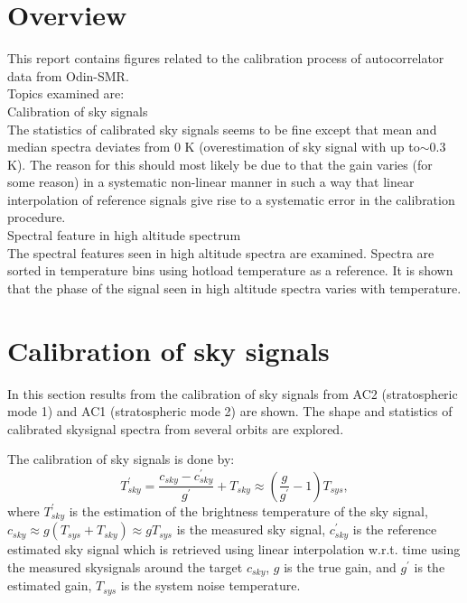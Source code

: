 \section{Overview}
This report contains figures related to the calibration
process of autocorrelator data from Odin-SMR.\\
\newline
Topics examined are:\\
\newline
Calibration of sky signals\\
The statistics of calibrated sky signals seems to be fine
except that mean and median spectra deviates from 0 K
(overestimation of sky signal with up to\(\sim\)0.3 K).
The reason for this should most likely be due to that
the gain varies (for some reason) in a systematic non-linear manner
in such a way that linear interpolation
of reference signals give rise to a systematic error
in the calibration procedure.\\
\newline
Spectral feature in high altitude spectrum\\
The spectral features seen in high altitude spectra are
examined. Spectra are sorted in temperature bins
using hotload temperature as a reference.
It is shown that the phase of the signal seen in high
altitude spectra varies with temperature.
\clearpage
\newpage

\section{Calibration of sky signals}
In this section results from the calibration of sky signals
from AC2 (stratospheric mode 1) and AC1 (stratospheric mode 2)
are shown. The shape and statistics of calibrated skysignal
spectra from several orbits are explored.  

The calibration of sky signals is done by:
\begin{equation}
\label{eq:skysig}
T^{'}_{sky}=\frac{c_{sky}-c^{'}_{sky}}{g^{'}}+T_{sky}\approx(\frac{g}{g^{'}}-1)T_{sys},
\end{equation}
where \(T^{'}_{sky}\) is the estimation of the brightness temperature
of the sky signal, \(c_{sky}\approx g(T_{sys}+T_{sky})\approx gT_{sys}\) is the measured sky signal,
 \(c^{'}_{sky}\) is the reference estimated sky signal
which is retrieved using linear interpolation w.r.t. time using
the measured skysignals around the target \(c_{sky}\),   
\(g\) is the true
gain, and \(g^{'}\) is the estimated gain, \(T_{sys}\) is the system
noise temperature. 

